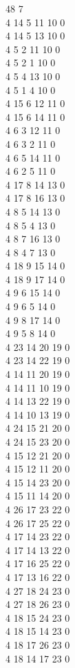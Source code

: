 \documentclass[12pt]{book}
\begin{document}
{ 48 7\\
 4  14 5 11 10  0\\
 4  14 5 13 10  0\\
 4  5 2 11 10  0\\
 4  5 2 1 10  0\\
 4  5 4 13 10  0\\
 4  5 1 4 10  0\\
 4  15 6 12 11  0\\
 4  15 6 14 11  0\\
 4  6 3 12 11  0\\
 4  6 3 2 11  0\\
 4  6 5 14 11  0\\
 4  6 2 5 11  0\\
 4  17 8 14 13  0\\
 4  17 8 16 13  0\\
 4  8 5 14 13  0\\
 4  8 5 4 13  0\\
 4  8 7 16 13  0\\
 4  8 4 7 13  0\\
 4  18 9 15 14  0\\
 4  18 9 17 14  0\\
 4  9 6 15 14  0\\
 4  9 6 5 14  0\\
 4  9 8 17 14  0\\
 4  9 5 8 14  0\\
 4  23 14 20 19  0\\
 4  23 14 22 19  0\\
 4  14 11 20 19  0\\
 4  14 11 10 19  0\\
 4  14 13 22 19  0\\
 4  14 10 13 19  0\\
 4  24 15 21 20  0\\
 4  24 15 23 20  0\\
 4  15 12 21 20  0\\
 4  15 12 11 20  0\\
 4  15 14 23 20  0\\
 4  15 11 14 20  0\\
 4  26 17 23 22  0\\
 4  26 17 25 22  0\\
 4  17 14 23 22  0\\
 4  17 14 13 22  0\\
 4  17 16 25 22  0\\
 4  17 13 16 22  0\\
 4  27 18 24 23  0\\
 4  27 18 26 23  0\\
 4  18 15 24 23  0\\
 4  18 15 14 23  0\\
 4  18 17 26 23  0\\
 4  18 14 17 23  0\\
}
\end{document}
